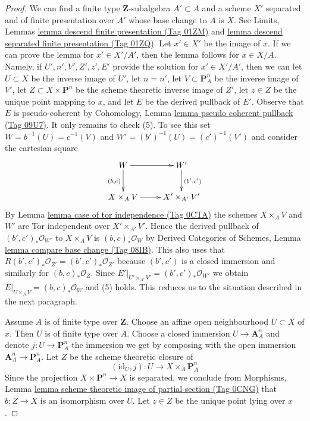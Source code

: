 \documentclass{amsart}
\theoremstyle{plain}
\theoremstyle{definition}
\theoremstyle{remark}
\numberwithin{equation}{subsection}
\begin{document}
\begin{proof}
We can find a finite type $\mathbf{Z}$-subalgebra $A' \subset A$
and a scheme $X'$ separated and of finite presentation over $A'$
whose base change to $A$ is $X$. See
Limits, Lemmas \href{https://stacks.math.columbia.edu/tag/01ZM}{lemma descend finite presentation (Tag 01ZM)} and
\href{https://stacks.math.columbia.edu/tag/01ZQ}{lemma descend separated finite presentation (Tag 01ZQ)}.
Let $x' \in X'$ be the image of $x$.
If we can prove the lemma for $x' \in X'/A'$, then
the lemma follows for $x \in X/A$.
Namely, if $U', n', V', Z', z', E'$ provide the solution
for $x' \in X'/A'$, then we can let
$U \subset X$ be the inverse image of $U'$,
let $n = n'$,
let $V \subset \mathbf{P}^n_A$ be the inverse image of $V'$,
let $Z \subset X \times \mathbf{P}^n$ be
the scheme theoretic inverse image of $Z'$,
let $z \in Z$ be the unique point mapping to $x$, and
let $E$ be the derived pullback of $E'$.
Observe that $E$ is pseudo-coherent by
Cohomology, Lemma \href{https://stacks.math.columbia.edu/tag/09U7}{lemma pseudo coherent pullback (Tag 09U7)}.
It only remains to check (5). To see this
set $W = b^{-1}(U) = c^{-1}(V)$ and $W' = (b')^{-1}(U) = (c')^{-1}(V')$ 
and consider the cartesian square
$$
\xymatrix{
W \ar[d]_{(b, c)} \ar[r] & W' \ar[d]^{(b', c')} \\
X \times_A V \ar[r] & X' \times_{A'} V'
}
$$
By Lemma \href{https://stacks.math.columbia.edu/tag/0CTA}{lemma case of tor independence (Tag 0CTA)} the schemes
$X \times_A V$ and $W'$ are Tor independent over $X' \times_{A'} V'$.
Hence the derived pullback of
$(b', c')_*\mathcal{O}_{W'}$ to $X \times_A V$
is $(b, c)_*\mathcal{O}_W$ by
Derived Categories of Schemes,
Lemma \href{https://stacks.math.columbia.edu/tag/08IB}{lemma compare base change (Tag 08IB)}.
This also uses that $R(b', c')_*\mathcal{O}_{Z'} = (b', c')_*\mathcal{O}_{Z'}$
because $(b', c')$ is a closed immersion and similarly for
$(b, c)_*\mathcal{O}_Z$.
Since $E'|_{U' \times_{A'} V'} =
(b', c')_*\mathcal{O}_{W'}$ we obtain
$E|_{U \times_A V} = (b, c)_*\mathcal{O}_W$
and (5) holds.
This reduces us to the situation described in the next
paragraph.

\medskip\noindent
Assume $A$ is of finite type over $\mathbf{Z}$.
Choose an affine open neighbourhood $U \subset X$ of $x$.
Then $U$ is of finite type over $A$.
Choose a closed immersion $U \to \mathbf{A}^n_A$ and denote
$j : U \to \mathbf{P}^n_A$ the immersion we get by composing
with the open immersion $\mathbf{A}^n_A \to \mathbf{P}^n_A$.
Let $Z$ be the scheme theoretic closure of
$$
(\text{id}_U, j) : U \longrightarrow X \times_A \mathbf{P}^n_A
$$
Since the projection $X \times \mathbf{P}^n \to X$ is separated,
we conclude from Morphisms, Lemma
\href{https://stacks.math.columbia.edu/tag/0CNG}{lemma scheme theoretic image of partial section (Tag 0CNG)}
that $b : Z \to X$ is an isomorphism over $U$.
Let $z \in Z$ be the unique point lying over $x$.


\end{proof}
\end{document}
